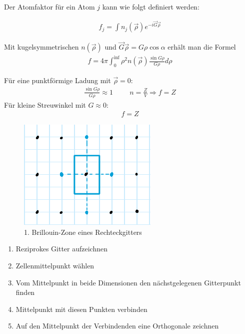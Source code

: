 Der Atomfaktor für ein Atom $j$ kann  wie folgt definiert werden:

\begin{align}
f_j = \int n_j (\vec{\rho}) e^{-i \vec{G} \vec{\rho}}
\end{align}

Mit kugelsymmetrischen $n(\vec{\rho})$ und $\vec{G} \vec{\rho} = G \rho \cos{\alpha}$ erhält man die Formel
\begin{align}
f = 4 \pi \int_0 ^{\inf} \rho^2 n(\vec{\rho}) \frac{\sin{G \rho}}{G \rho} d\rho
\end{align}

Für eine punktförmige Ladung mit $\vec{\rho} = 0$:
\begin{align}
\frac{\sin{G \rho}}{G \rho} \approx 1 \hspace{1cm} n = \frac{Z}{V} \Rightarrow f = Z
\end{align}
Für kleine Streuwinkel mit $G \approx 0$:
\begin{align}
f = Z
\end{align}

\label{q:28}

\begin{figure}[H]
    \centering
    \begin{samepage}
        \includegraphics[width=0.4\linewidth]{resources/09-05-2012/BZ1.pdf}
        \caption[1. BZ Rechteckgitter]{1. Brillouin-Zone eines Rechteckgitters}
        \label{fig:BZ1_rechteckgitter}
    \end{samepage}
\end{figure}
\begin{enumerate}
    \item Reziprokes Gitter aufzeichnen
    \item Zellenmittelpunkt wählen
    \item Vom Mittelpunkt in beide Dimensionen den nächstgelegenen Gitterpunkt finden
    \item Mittelpunkt mit diesen Punkten verbinden
    \item Auf den Mittelpunkt der Verbindenden eine Orthogonale zeichnen
\end{enumerate}

